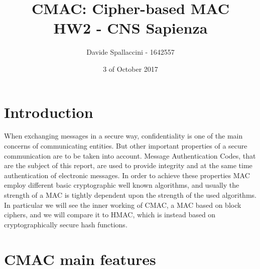 \documentclass[11pt]{article}
\begin{document}
\title{CMAC: Cipher-based MAC\\ HW2 - CNS Sapienza}
\author{Davide Spallaccini - 1642557}
\date{3 of October 2017}
\maketitle


\section{Introduction}
When exchanging messages in a secure way, confidentiality is one of the main concerns of communicating entities. But other important properties of a secure communication are to be taken into account. Message Authentication Codes, that are the subject of this report, are used to provide integrity and at the same time authentication of electronic messages. In order to achieve these properties MAC employ different basic cryptographic well known algorithms, and usually the strength of a MAC is tightly dependent upon the strength of the used algorithms. In particular we will see the inner working of CMAC, a MAC based on block ciphers, and we will compare it to HMAC, which is instead based on cryptographically secure hash functions.

\section{CMAC main features}
\end{document}
